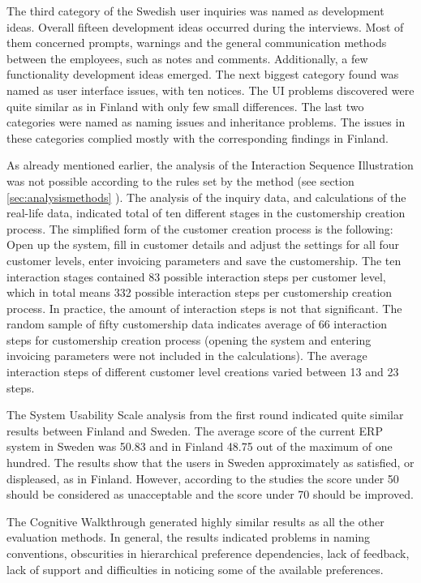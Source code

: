 \documentclass[12pt,a4paper,oneside,pdftex]{report}
\begin{document}
The third category of the Swedish user inquiries was named as development ideas. Overall fifteen development ideas occurred during the interviews. Most of them concerned prompts, warnings and the general communication methods between the employees, such as notes and comments. Additionally, a few functionality development ideas emerged. The next biggest category found was named as user interface issues, with ten notices. The UI problems discovered were quite similar as in Finland with only few small differences. The last two categories were named as naming issues and inheritance problems. The issues in these categories complied mostly with the corresponding findings in Finland. 

As already mentioned earlier, the analysis of the Interaction Sequence Illustration was not possible according to the rules set by the method (see section \ref{sec:analysismethods} ). The analysis of the inquiry data, and calculations of the real-life data, indicated total of ten different stages in the customership creation process. The simplified form of the customer creation process is the following: Open up the system, fill in customer details and adjust the settings for all four customer levels, enter invoicing parameters and save the customership. The ten interaction stages contained 83 possible interaction steps per customer level, which in total means 332 possible interaction steps per customership creation process. In practice, the amount of interaction steps is not that significant. The random sample of fifty customership data indicates average of 66 interaction steps for customership creation process (opening the system and entering invoicing parameters were not included in the calculations). The average interaction steps of different customer level creations varied between 13 and 23 steps.   

The System Usability Scale analysis from the first round indicated quite similar results between Finland and Sweden. The average score of the current ERP system in Sweden was 50.83 and in Finland 48.75 out of the maximum of one hundred. The results show that the users in Sweden approximately as satisfied, or displeased, as in Finland. However, according to the studies \citep{RefWorks:12} the score under 50 should be considered as unacceptable and the score under 70 should be improved. 

The Cognitive Walkthrough generated highly similar results as all the other evaluation methods. In general, the results indicated problems in naming conventions, obscurities in hierarchical preference dependencies, lack of feedback, lack of support and difficulties in noticing some of the available preferences. 
\end{document}
